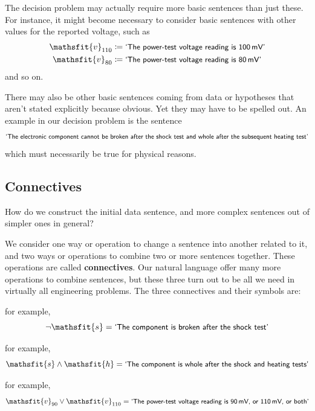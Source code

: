 \documentclass[
  a4paper,
  DIV=11,
  numbers=noendperiod,
  oneside]{scrreprt}
\providecommand{\tightlist}{%
  \setlength{\itemsep}{0pt}\setlength{\parskip}{0pt}}\usepackage{longtable,booktabs,array}
\begin{document}
The decision problem may actually require more basic sentences than just
these. For instance, it might become necessary to consider basic
sentences with other values for the reported voltage, such as
\[\begin{aligned}
\mathsfit{v}_{110} &\coloneqq \textsf{\small`The power-test voltage reading is 100\,mV'}
\\
\mathsfit{v}_{80} &\coloneqq \textsf{\small`The power-test voltage reading is 80\,mV'}
\end{aligned}\] and so on.

There may also be other basic sentences coming from data or hypotheses
that aren't stated explicitly because obvious. Yet they may have to be
spelled out. An example in our decision problem is the sentence \[
\textsf{\small`The electronic component cannot be broken after the shock test and whole after the subsequent heating test'}
\] which must necessarily be true for physical reasons.

\hypertarget{connectives}{%
\subsection{Connectives}\label{connectives}}

How do we construct the initial data sentence, and more complex
sentences out of simpler ones in general?

We consider one way or operation to change a sentence into another
related to it, and two ways or operations to combine two or more
sentences together. These operations are called {\textbf{connectives}}.
Our natural language offer many more operations to combine sentences,
but these three turn out to be all we need in virtually all engineering
problems. The three connectives and their symbols are:

\begin{description}
\tightlist
\item[{Not:~~\(\lnot\)}]
for example, \[
\lnot \mathsfit{s} = \textsf{\small`The component is broken after the shock test'}
\]
\item[{And:~~\(\land\)}]
for example, \[
\mathsfit{s} \land \mathsfit{h} = \textsf{\small`The component is whole after the shock and heating tests'}
\]
\item[{Or:~~\(\lor\)}]
for example, \[
\mathsfit{v}_{90} \lor \mathsfit{v}_{110} = \textsf{\small`The power-test voltage reading is 90\,mV, or 110\,mV, or both'}
\]
\end{description}
\end{document}
